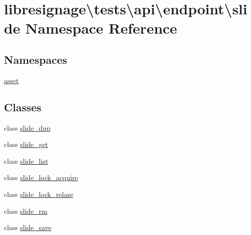 \hypertarget{namespacelibresignage_1_1tests_1_1api_1_1endpoint_1_1slide}{}\section{libresignage\textbackslash{}tests\textbackslash{}api\textbackslash{}endpoint\textbackslash{}slide Namespace Reference}
\label{namespacelibresignage_1_1tests_1_1api_1_1endpoint_1_1slide}
\subsection*{Namespaces}
\begin{DoxyCompactItemize}
\item 
 \hyperlink{namespacelibresignage_1_1tests_1_1api_1_1endpoint_1_1slide_1_1asset}{asset}
\end{DoxyCompactItemize}
\subsection*{Classes}
\begin{DoxyCompactItemize}
\item 
class \hyperlink{classlibresignage_1_1tests_1_1api_1_1endpoint_1_1slide_1_1slide__dup}{slide\+\_\+dup}
\item 
class \hyperlink{classlibresignage_1_1tests_1_1api_1_1endpoint_1_1slide_1_1slide__get}{slide\+\_\+get}
\item 
class \hyperlink{classlibresignage_1_1tests_1_1api_1_1endpoint_1_1slide_1_1slide__list}{slide\+\_\+list}
\item 
class \hyperlink{classlibresignage_1_1tests_1_1api_1_1endpoint_1_1slide_1_1slide__lock__acquire}{slide\+\_\+lock\+\_\+acquire}
\item 
class \hyperlink{classlibresignage_1_1tests_1_1api_1_1endpoint_1_1slide_1_1slide__lock__relase}{slide\+\_\+lock\+\_\+relase}
\item 
class \hyperlink{classlibresignage_1_1tests_1_1api_1_1endpoint_1_1slide_1_1slide__rm}{slide\+\_\+rm}
\item 
class \hyperlink{classlibresignage_1_1tests_1_1api_1_1endpoint_1_1slide_1_1slide__save}{slide\+\_\+save}
\end{DoxyCompactItemize}
